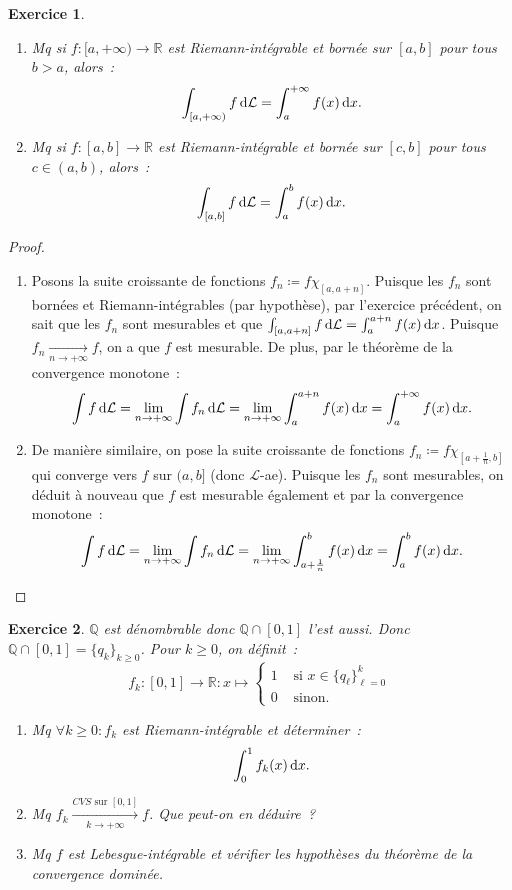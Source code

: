 \documentclass{article}
\newtheorem{ex}{Exercice}[section]
\theoremstyle{definition}
\newcommand{\pinfty}{{+\infty}}
\newcommand{\Q}{{\mathbb Q}}
\newcommand{\R}{{\mathbb R}}
\begin{document}
\begin{ex}~
\begin{enumerate}
	\item Mq si $f : [a, \pinfty) \to \R$ est Riemann-intégrable et bornée sur $[a, b]$ pour tous $b > a$, alors~:
	\[\int_{[a, \pinfty)}f\dif\mathcal L = \int_a^\pinfty f(x)\dif x.\]
	\item Mq si $f : [a, b] \to \R$ est Riemann-intégrable et bornée sur $[c, b]$ pour tous $c \in (a, b)$, alors~:
	\[\int_{[a, b]}f\dif\mathcal L = \int_a^bf(x)\dif x.\]
\end{enumerate}
\end{ex}

\begin{proof}~
\begin{enumerate}
	\item Posons la suite croissante de fonctions $f_n \coloneqq f\chi_{[a, a+n]}$. Puisque les $f_n$ sont bornées et Riemann-intégrables (par hypothèse), par l'exercice précédent,
	on sait que les $f_n$ sont mesurables et que $\int_{[a, a+n]}f\dif\mathcal L = \int_a^{a+n}f(x)\dif x$. Puisque $f_n \xrightarrow[n \to \pinfty]{} f$, on
	a que $f$ est mesurable. De plus, par le théorème de la convergence monotone~:
	\[\int f\dif\mathcal L = \lim_{n \to \pinfty}\int f_n\dif\mathcal L = \lim_{n \to \pinfty}\int_a^{a+n}f(x)\dif x = \int_a^\pinfty f(x)\dif x.\]

	\item De manière similaire, on pose la suite croissante de fonctions $f_n \coloneqq f\chi_{[a+\frac 1n, b]}$ qui converge vers $f$ sur $(a, b]$ (donc $\mathcal L$-ae).
	Puisque les $f_n$ sont mesurables, on déduit à nouveau que $f$ est mesurable également et par la convergence monotone~:
	\[\int f\dif\mathcal L = \lim_{n \to \pinfty}\int f_n\dif\mathcal L = \lim_{n \to \pinfty}\int_{a+\frac 1n}^bf(x)\dif x = \int_a^bf(x)\dif x.\]
\end{enumerate}
\end{proof}

\begin{ex} $\Q$ est dénombrable donc $\Q \cap [0, 1]$ l'est aussi. Donc $\Q \cap [0, 1] = \{q_k\}_{k \geq 0}$. Pour $k \geq 0$, on définit~:
\[f_k : [0, 1] \to \R : x \mapsto \begin{cases}1 &\text{ si } x \in \{q_\ell\}_{\ell=0}^k \\0 &\text{ sinon}.\end{cases}\]

\begin{enumerate}
	\item Mq $\forall k \geq 0 : f_k$ est Riemann-intégrable et déterminer~:
	\[\int_0^1f_k(x)\dif x.\]
	\item Mq $f_k \xrightarrow[k \to \pinfty]{CVS \text{ sur } [0, 1]} f$. Que peut-on en déduire~?
	\item Mq $f$ est Lebesgue-intégrable et vérifier les hypothèses du théorème de la convergence dominée.
\end{enumerate}
\end{ex}
\end{document}
